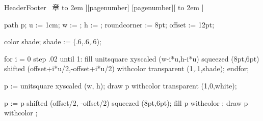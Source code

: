 \startsetups HeaderFooter
        \def\CurrentChapter{%
                第 \headnumber[chapter]\ 章%
                \hbox to 2em{}%
                \getmarking[chapter]%
                }
        \def\CurrentSection{%
                \headnumber[section]%
                \hbox to 2em{}%
                \getmarking[section]%
                }
        \setupheadertexts
                [\CurrentChapter][pagenumber]
                [pagenumber][\CurrentSection]
        \setupheader[style=\bfx,color=darkgray]
\stopsetups

\setupinteractionscreen[option=bookmark]

\setupbibtex[database=bibliography]
\setuppublications[alternative=lyr]

\setupinterlinespace[line=1.5em]
\setupwhitespace[big]

\setupfloats[indentnext=yes] 
\setupcaptions[style=\tfx, headstyle=\normal]


\setupfootnotes[way=bychapter]



\def\mycite#1{\cite[#1]}


    path p;
    u := 1cm; w := \overlaywidth; h := \overlayheight;
    roundcorner := 8pt; offset := 12pt;
    
    color shade;
    shade := (.6,.6,.6);

    for i = 0 step .02 until 1:
        fill unitsquare xyscaled (w-i*u,h-i*u) squeezed (8pt,6pt) 
             shifted (offset+i*u/2,-offset+i*u/2)
             withcolor transparent (1,.1,shade);
    endfor;

    p := unitsquare xyscaled (w, h);
    draw p withcolor transparent (1,0,white);

    p := p shifted (offset/2, -offset/2) squeezed (8pt,6pt);
    fill p withcolor ;
    draw p withcolor ;
\stopuniqueMPgraphic

\setupframedtexts[frame=off,background={shade box}]

\stopenvironment
